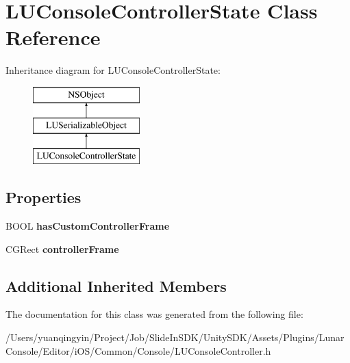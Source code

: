\hypertarget{interface_l_u_console_controller_state}{}\section{L\+U\+Console\+Controller\+State Class Reference}
\label{interface_l_u_console_controller_state}
Inheritance diagram for L\+U\+Console\+Controller\+State\+:\begin{figure}[H]
\begin{center}
\leavevmode
\includegraphics[height=3.000000cm]{interface_l_u_console_controller_state}
\end{center}
\end{figure}
\subsection*{Properties}
\begin{DoxyCompactItemize}
\item 
\mbox{\label{interface_l_u_console_controller_state_ab6c40c65786e69a0e5ff4465414c32ff}} 
B\+O\+OL {\bfseries has\+Custom\+Controller\+Frame}
\item 
\mbox{\label{interface_l_u_console_controller_state_a04627d83e9ce4ca179d18becfa621e87}} 
C\+G\+Rect {\bfseries controller\+Frame}
\end{DoxyCompactItemize}
\subsection*{Additional Inherited Members}


The documentation for this class was generated from the following file\+:\begin{DoxyCompactItemize}
\item 
/\+Users/yuanqingyin/\+Project/\+Job/\+Slide\+In\+S\+D\+K/\+Unity\+S\+D\+K/\+Assets/\+Plugins/\+Lunar\+Console/\+Editor/i\+O\+S/\+Common/\+Console/L\+U\+Console\+Controller.\+h\end{DoxyCompactItemize}
